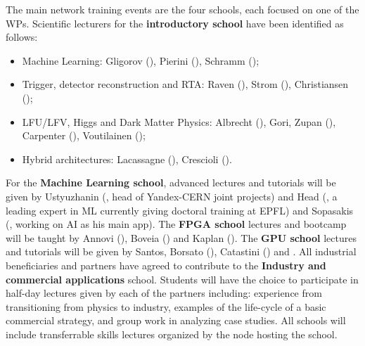 The main network training events are the four schools,
each focused on one of the WPs. 
Scientific lecturers for the \textbf{introductory school} have been identified as follows:
\begin{itemize}
\item Machine Learning: Gligorov (\cnrsentity), Pierini (\cernentity), Schramm (\unigeentity);
\item Trigger, detector reconstruction and RTA: Raven (\nikhefentity), Strom (\ohioentity), Christiansen (\lundentity);
\item LFU/LFV, Higgs and Dark Matter Physics: Albrecht (\dortmundentity), Gori, Zupan (\cincinnatientity), Carpenter (\ohioentity), Voutilainen (\helsinkientity);
\item Hybrid architectures: Lacassagne (\sorbonneentity), Crescioli (\cnrsentity). 
\end{itemize}
For the \textbf{Machine Learning school}, advanced lectures and tutorials will be given by Ustyuzhanin (\cernentity, head of Yandex-CERN joint projects)
and Head (\wildtreeentity, a leading expert in ML currently giving doctoral training at EPFL) and Sopasakis (\ximantisentity, working on AI as his main app). 
The \textbf{FPGA school} lectures and bootcamp will be taught by Annovi (\pisaentity), Boveia (\cernentity) and Kaplan (\heidelberginstrumentsentity). 
The \textbf{GPU school} lectures and tutorials will be given by Santos, Borsato (\santiagoentity), Catastini (\lightboxentity) and . 
All industrial beneficiaries and partners have agreed to contribute to the \textbf{Industry and commercial applications} school.
Students will have the choice to participate in half-day lectures given by each of the partners including: experience from transitioning from physics to industry, examples of the life-cycle of a basic commercial strategy, and group work in analyzing case studies. 
All schools will include transferrable skills lectures organized by the node hosting the school. 

